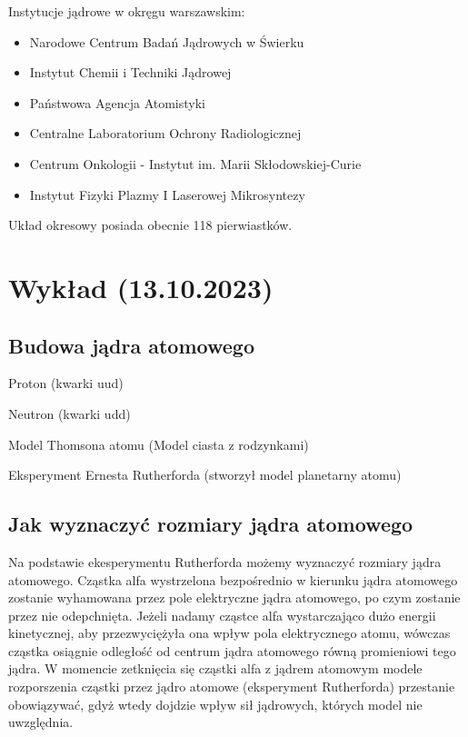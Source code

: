 \documentclass{article}
\begin{document}
Instytucje jądrowe w okręgu warszawskim:
\begin{itemize}
    \item Narodowe Centrum Badań Jądrowych w Świerku
    \item Instytut Chemii i Techniki Jądrowej
    \item Państwowa Agencja Atomistyki
    \item Centralne Laboratorium Ochrony Radiologicznej
    \item Centrum Onkologii - Instytut im. Marii Skłodowskiej-Curie
    \item Instytut Fizyki Plazmy I Laserowej Mikrosyntezy
\end{itemize}

Układ okresowy posiada obecnie 118 pierwiastków. 

\section{Wykład (13.10.2023)}

\subsection{Budowa jądra atomowego}

Proton (kwarki uud)

Neutron (kwarki udd)

Model Thomsona atomu (Model ciasta z rodzynkami)

Eksperyment Ernesta Rutherforda (stworzył model planetarny atomu)

\subsection{Jak wyznaczyć rozmiary jądra atomowego}

Na podstawie ekesperymentu Rutherforda możemy wyznaczyć rozmiary jądra atomowego. Cząstka alfa wystrzelona bezpośrednio w kierunku jądra atomowego zostanie wyhamowana przez pole elektryczne jądra atomowego, po czym zostanie przez nie odepchnięta. Jeżeli nadamy cząstce alfa wystarczająco dużo energii kinetycznej, aby przezwyciężyła ona wpływ pola elektrycznego atomu, wówczas cząstka osiągnie odległość od centrum jądra atomowego równą promieniowi tego jądra. W momencie zetknięcia się cząstki alfa z jądrem atomowym modele rozporszenia cząstki przez jądro atomowe (eksperyment Rutherforda) przestanie obowiązywać, gdyż wtedy dojdzie wpływ sił jądrowych, których model nie uwzględnia. 
\end{document}
